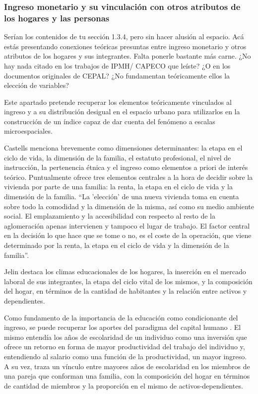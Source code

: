 	
\subsubsection{Ingreso monetario y su vinculación con otros atributos de los hogares y las personas}\label{MT-Fundamentos}
	
Serían los contenidos de tu sección 1.3.4, pero sin hacer alusión al espacio. Acá estás presentando conexiones teóricas presuntas entre ingreso monetario y otros atributos de los hogares y sus integrantes. Falta ponerle bastante más carne. ¿No hay nada citado en los trabajos de IPMH/ CAPECO que leíste? ¿O en los documentos originales de CEPAL? ¿No fundamentan teóricamente ellos la elección de variables?
	
Este apartado pretende recuperar los elementos teóricamente vinculados al ingreso y a su distribución desigual en el espacio urbano para utilizarlos en la construcción de un índice capaz de dar cuenta del fenómeno a escalas microespaciales.
	
Castells \citeyear{castells} menciona brevemente como dimensiones determinantes: la etapa en el ciclo de vida, la dimensión de la familia, el estatuto profesional, el nivel de instrucción, la pertenencia étnica y el ingreso como elementos a priori de interés teórico. Puntualmente ofrece tres elementos centrales a la hora de decidir sobre la vivienda por parte de una familia: la renta, la etapa en el ciclo de vida y la dimensión de la familia. “La 'elección' de una nueva vivienda toma en cuenta sobre todo la comodidad y la dimensión de la misma, así como su medio ambiente social. El emplazamiento y la accesibilidad con respecto al resto de la aglomeración apenas intervienen y tampoco el lugar de trabajo. El factor central en la decisión lo que hace que se tome o no, es el coste de la operación, que viene determinado por la renta, la etapa en el ciclo de vida y la dimensión de la familia”\cite[p.~215]{castells}.
	
Jelin \citeyear{jelin} destaca los climas educacionales de los hogares, la inserción en el mercado laboral de sus integrantes, la etapa del ciclo vital de los mismos, y la composición del hogar, en términos de la cantidad de habitantes y la relación entre activos y dependientes.
	
Como fundamento de la importancia de la educación como condicionante del ingreso, se puede recuperar los aportes del paradigma del capital humano \cite{mincer,beckar,schultz1961,schultz1962}. El mismo entendía los años de escolaridad de un individuo como una inversión que ofrece un retorno en forma de mayor productividad del trabajo del individuo y, entendiendo al salario como una función de la productividad, un mayor ingreso. A su vez, traza un vínculo entre mayores años de escolaridad en los miembros de una pareja que conforman una familia, con la composición del hogar en términos de cantidad de miembros y la proporción en el mismo de activos-dependientes.
	
